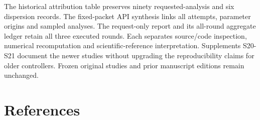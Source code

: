 \documentclass[11pt,letterpaper]{article}
\begin{document}
The historical attribution table preserves ninety requested-analysis and six dispersion records. The fixed-packet API synthesis links all attempts, parameter origins and sampled analyses. The request-only report and its all-round aggregate ledger retain all three executed rounds. Each separates source/\allowbreak{}code inspection, numerical recomputation and scientific-reference interpretation. Supplements S20-S21 document the newer studies without upgrading the reproducibility claims for older controllers. Frozen original studies and prior manuscript editions remain unchanged.


\clearpage

\section*{References}

\begingroup
\end{document}
